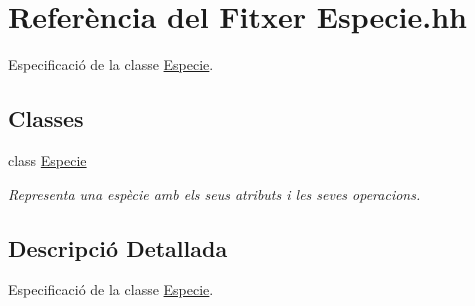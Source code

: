 \hypertarget{_especie_8hh}{}\section{Referència del Fitxer Especie.\+hh}
\label{_especie_8hh}


Especificació de la classe \hyperlink{class_especie}{Especie}.  


\subsection*{Classes}
\begin{DoxyCompactItemize}
\item 
class \hyperlink{class_especie}{Especie}
\begin{DoxyCompactList}\small\item\em Representa una espècie amb els seus atributs i les seves operacions. \end{DoxyCompactList}\end{DoxyCompactItemize}


\subsection{Descripció Detallada}
Especificació de la classe \hyperlink{class_especie}{Especie}. 


